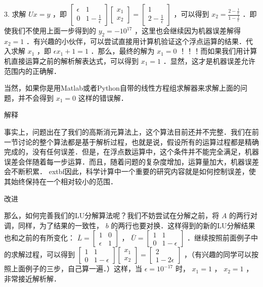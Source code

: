3. 求解  $Ux=y$  ，即  $\begin{bmatrix} \epsilon& 1\\ 0 &1-\frac{1}{\epsilon}  \end{bmatrix} \begin{bmatrix} x_1\\ x_2 \end{bmatrix}= \begin{bmatrix} 1\\ 2-\frac{1}{\epsilon} \end{bmatrix}$  ，可以得到  $x_2=\frac{2-\frac{1}{\epsilon}}{1-\frac{1}{\epsilon}}$  ．即使我们不使用上面一步得到的  $y_2=-10^{17}$  ，这里也会继续因为机器误差解得  $x_2=1$  ．有兴趣的小伙伴，可以尝试直接用计算机验证这个浮点运算的结果．代入求解  $x_1$  ，即  $\epsilon x_1+1=1$  ．那么，最终的解为  $x_1=0$  ！！！而如果我们用计算机直接运算之前的解析解表达式，可以得到  $x_1=1$  ．显然，这才是机器误差允许范围内的正确解．

当然，如果你是用Matlab或者Python自带的线性方程组求解器来求解上面的问题，并不会得到  $x_1=0$  这样的错误解．

解释

事实上，问题出在了我们的高斯消元算法上，这个算法目前还并不完整．我们在前一节讨论的整个算法都是基于解析过程，也就是说，假设所有的运算过程都是精确完成的，没有任何误差．但是，在浮点数运算中，这个条件并不能完全满足，机器误差会伴随着每一步运算．而且，随着问题的复杂度增加，运算量加大，机器误差会不断积累．	extbf{因此，科学计算中一个重要的研究内容就是如何控制误差，使其始终保持在一个相对较小的范围．}

改进

那么，如何完善我们的LU分解算法呢？我们不妨尝试在分解之前，将  $A$  的两行对调，同样，为了结果的一致性，  $b $  的两行也要对换．这样得到的新的LU分解结果也和之前的有所变化：  $\bar{L}=\begin{bmatrix} 1& 0\\ {\epsilon} & 1 \end{bmatrix}$  ，  $\bar{U}=\begin{bmatrix} 1& 1\\ 0 & 1-{\epsilon} \end{bmatrix}$  ．继续按照前面例子中的求解过程，可以得到  $\begin{bmatrix} 1& 1\\ 0 &1-{\epsilon}  \end{bmatrix} \begin{bmatrix} x_1\\ x_2 \end{bmatrix}= \begin{bmatrix} 2\\ 1-2{\epsilon} \end{bmatrix}$  ，（有兴趣的同学可以按照上面例子的三步，自己算一遍．）这样，当  $\epsilon=10^{-17}$  时，  $x_1=1$  ，  $x_2=1$  ，非常接近解析解．

